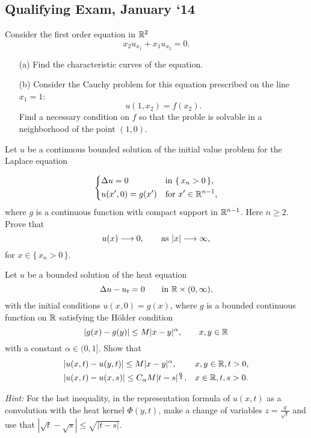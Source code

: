 \subsection{Qualifying Exam, January `14}
\begin{problem}
  Consider the first order equation in \(\mathbb{R}^2\)
  \[
    x_2u_{x_1}+x_1u_{x_2}=0.
  \]
  \begin{itemize}[noitemsep]
  \item[(a)] Find the characteristic curves of the equation.
  \item[(b)] Consider the Cauchy problem for this equation prescribed on
    the line \(x_1=1\):
    \[
      u(1,x_2)=f(x_2).
    \]
    Find a necessary condition on \(f\) so that the proble is solvable in a
    neighborhood of the point \((1,0)\).
  \end{itemize}
\end{problem}
\begin{solution*}
\end{solution*}

\begin{problem}
  Let \(u\) be a continuous bounded solution of the initial value problem
  for the Laplace equation

  \[
    \left\{
      \begin{aligned}
        &\Delta u=0&&\text{in \(\{\,x_n>0\,\}\),}\\
        &u(x',0)=g(x')&&\text{for \(x'\in\mathbb{R}^{n-1}\),}
      \end{aligned}
    \right.
  \]
  where \(g\) is a continuous function with compact support in
  \(\mathbb{R}^{n-1}\). Here \(n\geq 2\). Prove that
  \[
    u(x)\To 0,\qquad%
    \text{as } |x|\To \infty,
  \]
  for \(x\in\{\,x_n>0\,\}\).
\end{problem}
\begin{solution*}
\end{solution*}

\begin{problem}
  Let \(u\) be a bounded solution of the heat equation
  \[
    \Delta u-u_t=0\qquad\text{in \(\mathbb{R}\times(0,\infty)\),}
  \]
  with the initial conditions \(u(x,0)=g(x)\), where \(g\) is a bounded
  continuous function on \(\mathbb{R}\) satisfying the Hölder condition
  \[
    |g(x)-g(y)|\leq M|x-y|^\alpha,\qquad x,y\in\mathbb{R}
  \]
  with a constant \(\alpha\in (0, 1]\). Show that
  \[
    \begin{aligned}
      &|u(x,t)-u(y,t)|\leq M|x-y|^\alpha,&&x,y\in\mathbb{R},t>0,\\
      &|u(x,t)-u(x,s)|\leq C_\alpha M|t-s|^{\frac{\alpha}{2}},&&x\in\mathbb{R},t,s>0.
    \end{aligned}
  \]

  \noindent\emph{Hint:} For the last inequality, in the representation formula of
  \(u(x,t)\) as a convolution with the heat kernel \(\Phi(y,t)\), make a
  change of variables \(z=\frac{y}{\sqrt{t}}\) and use that
  $\left|\sqrt{t}-\sqrt{s}\right|\leq\sqrt{|t-s|}$.
\end{problem}
\begin{solution*}
\end{solution*}

